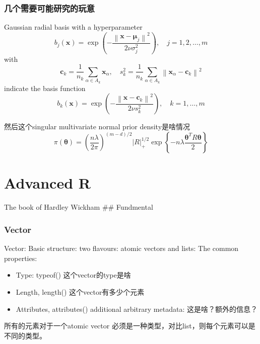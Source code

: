 \documentclass[
]{book}
\providecommand{\tightlist}{%
  \setlength{\itemsep}{0pt}\setlength{\parskip}{0pt}}
\theoremstyle{definition}
\theoremstyle{definition}
\theoremstyle{definition}
\theoremstyle{remark}
\begin{document}
\hypertarget{ux51e0ux4e2aux9700ux8981ux53efux80fdux7814ux7a76ux7684ux73a9ux610f}{%
\subsection{几个需要可能研究的玩意}\label{ux51e0ux4e2aux9700ux8981ux53efux80fdux7814ux7a76ux7684ux73a9ux610f}}

Gaussian radial basis with a hyperparameter
\[
b_{j}(\boldsymbol{x})=\exp \left(-\frac{\left\|\boldsymbol{x}-\boldsymbol{\mu}_{j}\right\|^{2}}{2 \nu \sigma_{j}^{2}}\right), \quad j=1,2, \ldots, m
\]
with
\[
\boldsymbol{c}_{k}=\frac{1}{n_{k}} \sum_{\alpha \in A_{k}} \boldsymbol{x}_{\alpha}, \quad s_{k}^{2}=\frac{1}{n_{k}} \sum_{\alpha \in A_{k}}\left\|\boldsymbol{x}_{\alpha}-\boldsymbol{c}_{k}\right\|^{2}
\]
indicate the basis function
\[
b_{k}(\boldsymbol{x})=\exp \left(-\frac{\left\|\boldsymbol{x}-\boldsymbol{c}_{k}\right\|^{2}}{2 \nu s_{k}^{2}}\right), \quad k=1, \ldots, m
\]

然后这个singular multivariate normal prior density是啥情况
\[
\pi(\boldsymbol{\theta})=\left(\frac{n \lambda}{2 \pi}\right)^{(m-d) / 2}|R|_{+}^{1 / 2} \exp \left\{-n \lambda \frac{\boldsymbol{\theta}^{T} R \boldsymbol{\theta}}{2}\right\}
\]

\hypertarget{advanced-r}{%
\chapter{Advanced R}\label{advanced-r}}

The book of Hardley Wickham
\#\# Fundmental

\hypertarget{vector}{%
\subsection{Vector}\label{vector}}

Vector: Basic structure: two flavours: atomic vectors and lists: The common properties:

\begin{itemize}
\tightlist
\item
  Type: typeof() 这个vector的type是啥
\item
  Length, length() 这个vector有多少个元素
\item
  Attributes, attributes() additional arbitrary metadata: 这是啥？额外的信息？
\end{itemize}

所有的元素对于一个atomic vector 必须是一种类型，对比list，则每个元素可以是不同的类型。
\end{document}
